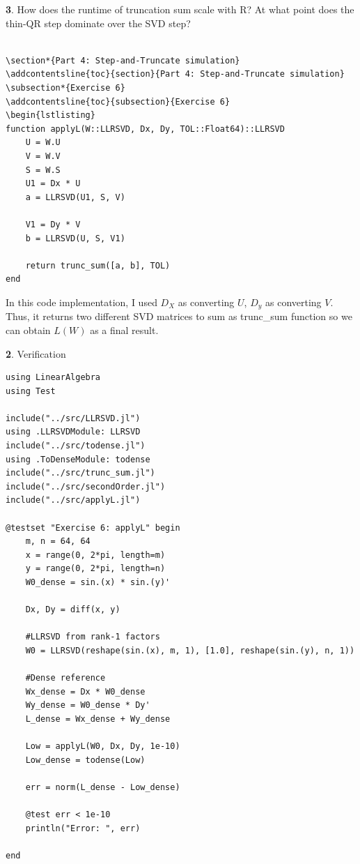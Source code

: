 \documentclass[11pt]{article}
\begin{document}
\vspace{1.5em}

\textbf{3}. How does the runtime of truncation sum scale with R? At what point does the thin-QR step dominate over the SVD step?

\vspace{0.8em}
\vspace{1.5em}
\begin{lstlisting}

\section*{Part 4: Step-and-Truncate simulation}
\addcontentsline{toc}{section}{Part 4: Step-and-Truncate simulation}
\subsection*{Exercise 6}
\addcontentsline{toc}{subsection}{Exercise 6}
\begin{lstlisting}
function applyL(W::LLRSVD, Dx, Dy, TOL::Float64)::LLRSVD
    U = W.U
    V = W.V
    S = W.S
    U1 = Dx * U
    a = LLRSVD(U1, S, V)

    V1 = Dy * V
    b = LLRSVD(U, S, V1)

    return trunc_sum([a, b], TOL)
end

\end{lstlisting}
In this code implementation, I used $D_X$ as converting $U$, $D_y$ as converting $V$. Thus, it returns two different SVD matrices to sum as trunc\_sum function so we can obtain $L(W)$ as a final result.

\vspace{1.5em}

\textbf{2}. Verification

\begin{lstlisting}
using LinearAlgebra
using Test

include("../src/LLRSVD.jl")
using .LLRSVDModule: LLRSVD
include("../src/todense.jl")
using .ToDenseModule: todense
include("../src/trunc_sum.jl")
include("../src/secondOrder.jl")
include("../src/applyL.jl")

@testset "Exercise 6: applyL" begin
    m, n = 64, 64
    x = range(0, 2*pi, length=m)
    y = range(0, 2*pi, length=n)
    W0_dense = sin.(x) * sin.(y)'

    Dx, Dy = diff(x, y)

    #LLRSVD from rank-1 factors
    W0 = LLRSVD(reshape(sin.(x), m, 1), [1.0], reshape(sin.(y), n, 1))

    #Dense reference
    Wx_dense = Dx * W0_dense
    Wy_dense = W0_dense * Dy'
    L_dense = Wx_dense + Wy_dense

    Low = applyL(W0, Dx, Dy, 1e-10)
    Low_dense = todense(Low)

    err = norm(L_dense - Low_dense)

    @test err < 1e-10
    println("Error: ", err)

end
\end{lstlisting}
\end{document}
